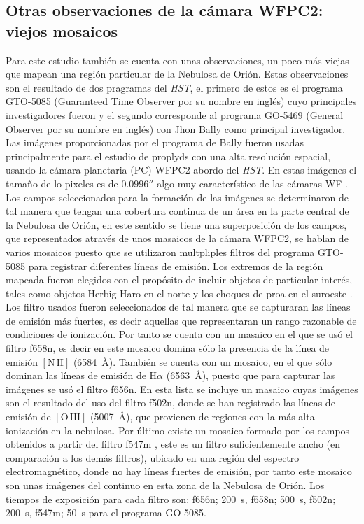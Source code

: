 \documentclass{article}
\newcommand\ha{\ensuremath{\mathrm{H}\alpha}}
\newcommand\nii{\ensuremath{\mathrm{[N\,II]}}}
\newcommand\oiii{\ensuremath{\mathrm{[O\,III]}}}
\newcommand\A{\ensuremath{\text{\AA{}}}}
\begin{document}
\subsection{Otras observaciones de la cámara WFPC2:  viejos mosaicos}
\label{sec:mosaic}

Para este estudio también se cuenta con unas observaciones, un poco más viejas que mapean una región particular de la Nebulosa de Orión. Estas observaciones son el resultado de dos pragramas del \textit{HST}, el primero de estos es el programa GTO-5085 (Guaranteed Time Observer  por su nombre en inglés) cuyo principales investigadores fueron  \citet{Odell:1996} y el segundo corresponde al programa GO-5469 (General Observer por su nombre en inglés) con Jhon Bally como principal investigador. Las imágenes proporcionadas por el programa de Bally fueron usadas principalmente para el estudio de proplyds con una  alta resolución espacial, usando la cámara planetaria (PC) WFPC2 abordo del \textit{HST}. En estas imágenes el tamaño de lo pixeles es de \(0.0996''\) algo muy característico de las cámaras WF \citep{Holtzman:1995}. Los campos seleccionados para la formación de las imágenes se determinaron de tal manera que tengan una cobertura continua de un área en la parte central de la Nebulosa de Orión, en este sentido se tiene una superposición de los campos, que representados através de unos  masaicos de la cámara WFPC2, se hablan de varios mosaicos puesto que se utilizaron multpliples filtros del programa GTO-5085 para registrar diferentes líneas de emisión. Los extremos de la región mapeada fueron elegidos con el propósito de incluir objetos de particular interés, tales como objetos Herbig-Haro en el norte y los choques de proa en el suroeste \citep{Odell:1996}.\\

 Los filtro usados fueron seleccionados de tal manera que se capturaran las líneas de emisión más fuertes, es decir aquellas que representaran un rango razonable de condiciones de ionización. Por tanto se cuenta con un masaico en el que se usó el filtro f658n, es decir en este mosaico domina sólo la presencia de la línea de emisión \nii{} (6584~\A{}). También se cuenta con un mosaico, en el que sólo dominan las líneas de emisión de \ha{} (6563~\A{}), puesto que para capturar las imágenes se usó el filtro f656n. En esta lista se incluye un masaico cuyas imágenes son el resultado del uso del filtro f502n, donde se han registrado las líneas de emisión de \oiii{} (5007~\A{}), que provienen de regiones con la más alta ionización en la nebulosa. Por último existe un mosaico formado por los campos obtenidos a partir del filtro f547m \citep{Burrows:1995}, este es un filtro suficientemente ancho (en comparación a los demás filtros), ubicado en una región del espectro electromagnético, donde no hay líneas fuertes de emisión, por tanto este mosaico son unas imágenes del continuo en esta zona de la Nebulosa de Orión. Los tiempos de exposición para cada filtro son: f656n;  200~s, f658n; 500~s, f502n; 200~s, f547m; 50~s para el programa GO-5085. 




\end{document}
